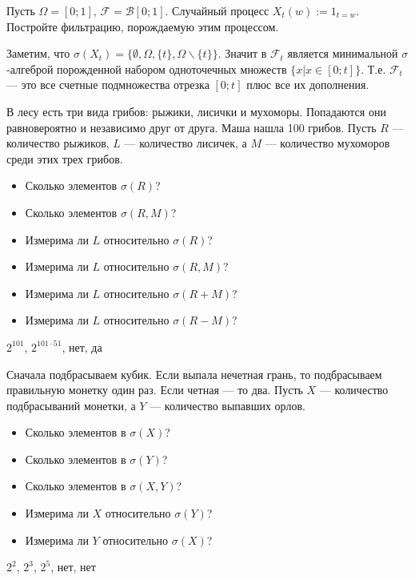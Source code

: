 \begin{problem}
Пусть $\Omega=[0;1]$, $ \mathcal{F}=\mathcal{B}[0;1] $. Случайный процесс $X_{t}(w):=1_{t=w}$. Постройте фильтрацию, порождаемую этим процессом.
\end{problem} 
\begin{solution} 
Заметим, что $\sigma(X_{t})=\{\emptyset,\Omega,\{t\},\Omega\backslash\{t\}\}$. Значит в $ \mathcal{F}_{t} $ является минимальной $\sigma  $-алгеброй порожденной набором одноточечных множеств $\{x|x\in [0;t]\}$. Т.е. $\mathcal{F}_{t}$ --- это все счетные подмножества отрезка $[0;t]$ плюс все их дополнения.
\end{solution}

\begin{problem}
В лесу есть три вида грибов: рыжики, лисички и мухоморы. Попадаются они равновероятно и независимо друг от друга. Маша нашла 100 грибов. Пусть $R$ --- количество рыжиков, $L$ --- количество лисичек, а $ M $ --- количество мухоморов среди этих трех грибов.
\begin{itemize}
\item Сколько элементов $ \sigma(R)$? 
\item Сколько элементов $ \sigma(R,M)$? 
\item Измерима ли $L$ относительно $ \sigma(R)$?
\item Измерима ли $L$ относительно $ \sigma(R,M)$?
\item Измерима ли $L$ относительно $ \sigma(R+M)$?
\item Измерима ли $L$ относительно $ \sigma(R-M)$?
\end{itemize} 
\end{problem} 
\begin{solution} 
$ 2^{101} $, $2^{101\cdot 51}$, нет, да 
\end{solution}

\begin{problem}
Сначала подбрасываем кубик. Если выпала нечетная грань, то подбрасываем правильную монетку один раз. Если четная --- то два. Пусть $X$ --- количество подбрасываний монетки, а $Y$ --- количество выпавших орлов.

\begin{itemize}

\item Сколько элементов в $ \sigma(X)$? 
\item Сколько элементов в $ \sigma(Y)$? 
\item Сколько элементов в $ \sigma(X,Y)$? 
\item Измерима ли $ X $ относительно $ \sigma(Y)$? 
\item Измерима ли $ Y $ относительно $ \sigma(X)$? 

\end{itemize} 
\end{problem} 
\begin{solution} 
 $ 2^{2} $, $ 2^{3} $, $ 2^{5} $, нет, нет
\end{solution}

